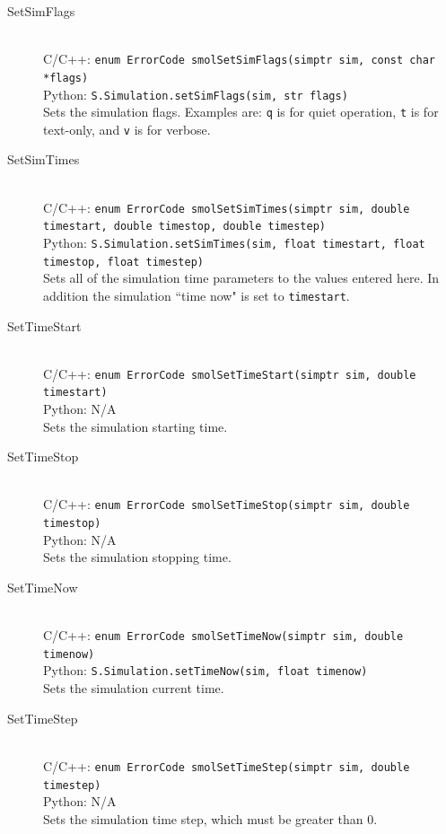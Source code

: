 \documentclass {scrbook}
\newcommand {\ttt} {\texttt}
\begin{document}
\begin{description}

\item[SetSimFlags]
\hfill \\
C/C++: \ttt{enum ErrorCode smolSetSimFlags(simptr sim, const char *flags)}\\
Python: \ttt{S.Simulation.setSimFlags(sim, str flags)}\\
Sets the simulation flags. Examples are: \ttt{q} is for quiet operation, \ttt{t} is for text-only, and \ttt{v} is for verbose.

\item[SetSimTimes]
\hfill \\
C/C++: \ttt{enum ErrorCode smolSetSimTimes(simptr sim, double timestart, double timestop, double timestep)}\\
Python: \ttt{S.Simulation.setSimTimes(sim, float timestart, float timestop, float timestep)}\\
Sets all of the simulation time parameters to the values entered here. In addition the simulation ``time now" is set to \ttt{timestart}.

\item[SetTimeStart]
\hfill \\
C/C++: \ttt{enum ErrorCode smolSetTimeStart(simptr sim, double timestart)}\\
Python: N/A\\
Sets the simulation starting time.

\item[SetTimeStop]
\hfill \\
C/C++: \ttt{enum ErrorCode smolSetTimeStop(simptr sim, double timestop)}\\
Python: N/A\\
Sets the simulation stopping time.

\item[SetTimeNow]
\hfill \\
C/C++: \ttt{enum ErrorCode smolSetTimeNow(simptr sim, double timenow)}\\
Python: \ttt{S.Simulation.setTimeNow(sim, float timenow)}\\
Sets the simulation current time.

\item[SetTimeStep]
\hfill \\
C/C++: \ttt{enum ErrorCode smolSetTimeStep(simptr sim, double timestep)}\\
Python: N/A\\
Sets the simulation time step, which must be greater than 0.


\end{description}
\end{document}
